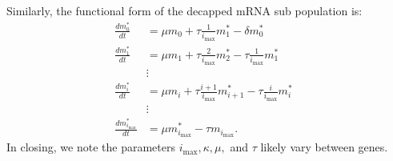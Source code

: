 \documentclass[a4,center,fleqn,nocrop]{NAR}
\newcommand{\imax}{\ensuremath{{i_{\max}}}\xspace}
\begin{document}

Similarly, the functional form of the decapped mRNA sub population is: 
\begin{align}\label{eq:Decapped_ODE}
\frac{dm_{0}^{*}}{dt} &= \mu m_{0}+ \tau \frac{1}{\imax}m_{1}^{*}-\delta m_{0}^{*} \nonumber \\
\frac{dm_{1}^{*}}{dt} &= \mu m_{1}+ \tau \frac{2}{\imax}m_{2}^{*}-\tau \frac{1}{\imax} m_{1}^{*} \nonumber \\
& \vdots & \nonumber \\
\frac{dm_{i}^{*}}{dt} &= \mu m_{i}+ \tau \frac{i+1}{\imax}m_{i+1}^{*}-\tau \frac{i}{\imax} m_{i}^{*} \nonumber \\
& \vdots & \nonumber \\
\frac{dm_{\imax}^{*}}{dt} &= \mu m_{\imax}^{*}- \tau m_{\imax}. 
\end{align}
In closing, we note the parameters $\imax, \kappa, \mu,$ and $\tau$ likely vary between genes.
\end{document}
